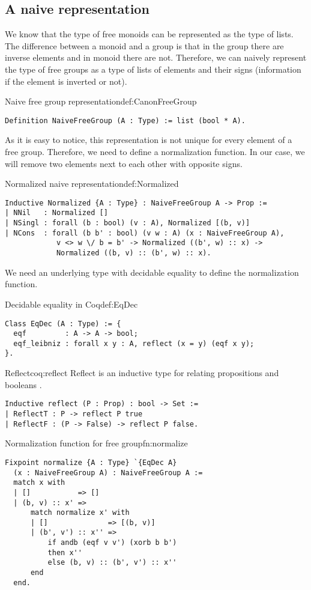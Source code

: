 \subsection{A naive representation}
We know that the type of free monoids can be represented as the type of lists. The difference between a monoid and a group is that in the group there are inverse elements and in monoid there are not. Therefore, we can naively represent the type of free groups as a type of lists of elements and their signs (information if the element is inverted or not).
\begin{defi}{Naive free group representation}{def:CanonFreeGroup}
\begin{verbatim}
Definition NaiveFreeGroup (A : Type) := list (bool * A).
\end{verbatim}
\end{defi}
As it is easy to notice, this representation is not unique for every element of a free group. Therefore, we need to define a normalization function. In our case, we will remove two elements next to each other with opposite signs.
\begin{defi}{Normalized naive representation}{def:Normalized}
\begin{verbatim}
Inductive Normalized {A : Type} : NaiveFreeGroup A -> Prop :=
| NNil   : Normalized []
| NSingl : forall (b : bool) (v : A), Normalized [(b, v)]
| NCons  : forall (b b' : bool) (v w : A) (x : NaiveFreeGroup A), 
            v <> w \/ b = b' -> Normalized ((b', w) :: x) ->
            Normalized ((b, v) :: (b', w) :: x).
\end{verbatim}
\end{defi}
We need an underlying type with decidable equality to define the normalization function. \pagebreak
\begin{defi}{Decidable equality in Coq}{def:EqDec}
\begin{verbatim}
Class EqDec (A : Type) := { 
  eqf         : A -> A -> bool;
  eqf_leibniz : forall x y : A, reflect (x = y) (eqf x y);
}.
\end{verbatim}
\end{defi}
\begin{coq}{Reflect}{coq:reflect}
Reflect is an inductive type for
relating propositions and booleans \cite{coqDoc}.
\begin{verbatim}
Inductive reflect (P : Prop) : bool -> Set :=
| ReflectT : P -> reflect P true
| ReflectF : (P -> False) -> reflect P false.
\end{verbatim}
\end{coq}
\begin{func}{Normalization function for free group}{fn:normalize}
\begin{verbatim}
Fixpoint normalize {A : Type} `{EqDec A} 
  (x : NaiveFreeGroup A) : NaiveFreeGroup A :=
  match x with
  | []           => []
  | (b, v) :: x' => 
      match normalize x' with
      | []              => [(b, v)]
      | (b', v') :: x'' => 
          if andb (eqf v v') (xorb b b')
          then x''
          else (b, v) :: (b', v') :: x''
      end
  end.
\end{verbatim}
\end{func}
